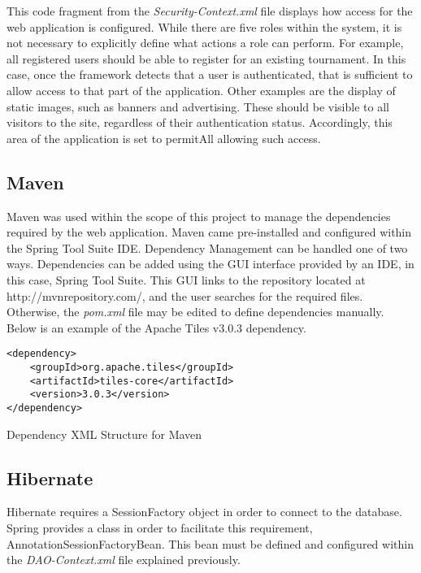 This code fragment from the \textit{Security-Context.xml} file displays how access for the web application is configured. While there are five roles within the system, it is not necessary to explicitly define what actions a role can perform. For example, all registered users should be able to register for an existing tournament. In this case, once the framework detects that a user is authenticated, that is sufficient to allow access to that part of the application. Other examples are the display of static images, such as banners and advertising. These should be visible to all visitors to the site, regardless of their authentication status. Accordingly, this area of the application is set to permitAll allowing such access.

\subsection{Maven}

Maven was used within the scope of this project to manage the dependencies required by the web application. Maven came pre-installed and configured within the Spring Tool Suite IDE. Dependency Management can be handled one of two ways. Dependencies can be added using the GUI interface provided by an IDE, in this case, Spring Tool Suite. This GUI links to the repository located at http://mvnrepository.com/, and the user searches for the required files. Otherwise, the \textit{pom.xml} file may be edited to define dependencies manually. Below is an example of the Apache Tiles v3.0.3 dependency.

\begin{table}[H]
\begin{lstlisting}
<dependency>
	<groupId>org.apache.tiles</groupId>
	<artifactId>tiles-core</artifactId>
	<version>3.0.3</version>
</dependency>
\end{lstlisting}
\caption{Dependency XML Structure for Maven}
\end{table}

\subsection{Hibernate}

Hibernate requires a SessionFactory object in order to connect to the database. Spring provides a class in order to facilitate this requirement, AnnotationSessionFactoryBean. This bean must be defined and configured within the \textit{DAO-Context.xml} file explained previously. 

